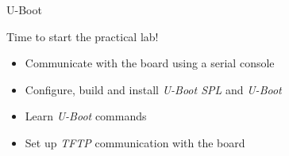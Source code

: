 \setuplabframe
{U-Boot}
{
  Time to start the practical lab!
  \begin{itemize}
  \item Communicate with the board using a serial console
  \item Configure, build and install {\em U-Boot SPL}
        and {\em U-Boot}
  \item Learn {\em U-Boot} commands
  \item Set up {\em TFTP} communication with the board
  \end{itemize}
}
